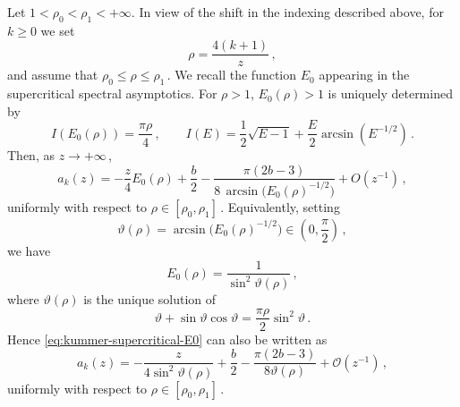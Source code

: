 \documentclass[11pt]{amsart}
\numberwithin{equation}{section}
\theoremstyle{remark}
\begin{document}
Let
$
1<\rho_0<\rho_1<+\infty.
$
In view of the shift in the indexing described above, for $k\geq0$ we set
\begin{equation}\label{eq:kummer-rho-super}
	\rho=\frac{4(k+1)}{z}\,,
\end{equation}
and assume that
$
\rho_0\leq\rho\leq\rho_1\,.
$
We recall the function $E_0$ appearing in the supercritical spectral
asymptotics. For $\rho>1$, $E_0(\rho)>1$ is uniquely determined by
\[
I(E_0(\rho))=\frac{\pi\rho}{4}\,,
\qquad
I(E)=\frac12\sqrt{E-1}
+\frac{E}{2}\arcsin(E^{-1/2})\,.
\]
Then, as $z\to+\infty\,$,
\begin{equation}\label{eq:kummer-supercritical-E0}
	a_k(z)
	=
	-\frac z4 E_0(\rho)
	+\frac b2
	-\frac{\pi(2b-3)}
	{8\,\arcsin\bigl(E_0(\rho)^{-1/2}\bigr)}
	+O(z^{-1})\,,
\end{equation}
uniformly with respect to $\rho\in[\rho_0,\rho_1]\,$. Equivalently, setting
\begin{equation}
\vartheta(\rho)
=
\arcsin\bigl(E_0(\rho)^{-1/2}\bigr)
\in\left(0,\frac{\pi}{2}\right)\,,
\end{equation}
we have
\begin{equation}
E_0(\rho)=\frac{1}{\sin^2\vartheta(\rho)}\,,
\end{equation}
where $\vartheta(\rho)$ is the unique solution of
\begin{equation}\label{eq:kummer-theta}
	\vartheta+\sin\vartheta\cos\vartheta
	=
	\frac{\pi\rho}{2}\sin^2\vartheta\,.
\end{equation}
Hence \eqref{eq:kummer-supercritical-E0} can also be written as
\begin{equation}\label{eq:kummer-supercritical}
	a_k(z)
	=
	-\frac{z}{4\sin^2\vartheta(\rho)}
	+\frac b2
	-\frac{\pi(2b-3)}{8\vartheta(\rho)}
	+\mathcal O(z^{-1})\,,
\end{equation}
uniformly with respect to $\rho\in[\rho_0,\rho_1]\,$.
\end{document}
